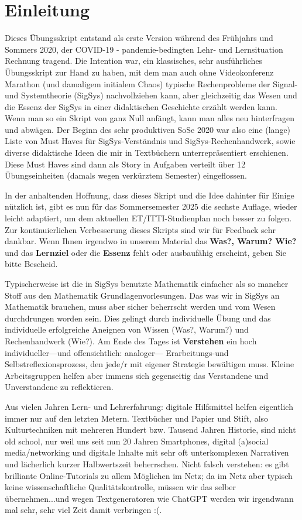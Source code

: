 \newpage
\section*{Einleitung}
%

Dieses Übungsskript entstand als erste Version während des Frühjahrs und Sommers 2020, der
COVID-19 - pandemie-bedingten Lehr- und Lernsituation Rechnung tragend.
%
Die Intention war, ein klassisches, sehr ausführliches Übungsskript zur Hand zu haben,
mit dem man auch ohne Videokonferenz Marathon (und damaligem initialem Chaos)
typische Rechenprobleme der Signal- und Systemtheorie (SigSys) nachvollziehen kann, aber gleichzeitig das Wesen und die Essenz der SigSys in einer didaktischen Geschichte erzählt werden kann.
%
Wenn man so ein Skript von ganz Null anfängt, kann man alles neu hinterfragen und abwägen. Der Beginn des sehr produktiven SoSe 2020 war also eine (lange) Liste von Must Haves für SigSys-Verständnis und SigSys-Rechenhandwerk, sowie diverse didaktische Ideen die mir in Textbüchern unterrepräsentiert erschienen. Diese Must Haves sind dann als Story in Aufgaben verteilt über 12 Übungseinheiten (damals wegen verkürztem Semester) eingeflossen.

In der anhaltenden Hoffnung, dass dieses Skript und die Idee dahinter für Einige nützlich ist, gibt es nun für das Sommersemester 2025 die sechste Auflage, wieder leicht adaptiert,
um dem aktuellen ET/ITTI-Studienplan noch besser zu folgen.
%
Zur kontinuierlichen Verbesserung dieses Skripts sind wir für Feedback sehr dankbar.
%
Wenn Ihnen irgendwo in unserem Material das \textbf{Was?, Warum? Wie?} und das
\textbf{Lernziel} oder die \textbf{Essenz} fehlt oder ausbaufähig erscheint, geben Sie bitte Bescheid.

Typischerweise ist die in SigSys benutzte Mathematik einfacher als so mancher
Stoff aus den Mathematik Grundlagenvorlesungen.
%
Das was wir in SigSys an Mathematik brauchen, muss aber sicher beherrscht werden
und vom Wesen durchdrungen worden sein.
%
Dies gelingt durch individuelle Übung und das individuelle erfolgreiche Aneignen
von Wissen (Was?, Warum?) und Rechenhandwerk (Wie?).
%
Am Ende des Tages ist \textbf{Verstehen} ein hoch individueller---und offensichtlich: analoger---
Erarbeitungs-und Selbstreflexionsprozess, den jede/r mit eigener Strategie bewältigen muss.
%
Kleine Arbeitsgruppen helfen aber immens sich gegenseitig das Verstandene und
Unverstandene zu reflektieren.

Aus vielen Jahren Lern- und Lehrerfahrung: digitale Hilfsmittel helfen eigentlich immer nur auf den letzten Metern. Textbücher und Papier und Stift, also Kulturtechniken mit mehreren Hundert bzw. Tausend Jahren Historie, sind nicht old school, nur weil uns seit nun 20 Jahren Smartphones, digital (a)social media/networking und digitale Inhalte mit sehr oft unterkomplexen Narrativen und lächerlich kurzer Halbwertszeit beherrschen. Nicht falsch verstehen: es gibt brilliante Online-Tutorials zu allem Möglichen im Netz; da im Netz aber typisch keine wissenschaftliche Qualitätskontrolle, müssen wir das selber übernehmen...und wegen Textgeneratoren wie ChatGPT werden wir irgendwann mal sehr, sehr viel Zeit damit verbringen :(.

